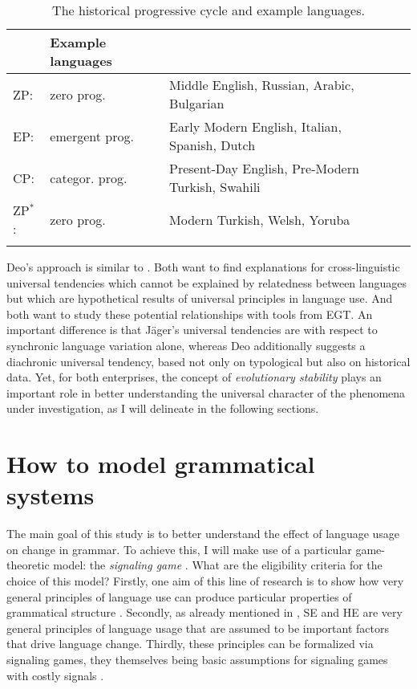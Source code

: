 \documentclass[output=paper,hidelinks]{langscibook}
\begin{document}
\begin{table}
\caption{The historical progressive cycle and example languages.\label{cycle}}
\begin{tabular}{l@{ }lll}
\lsptoprule
\multicolumn{2}{l}{System} &  Example languages \\\midrule
ZP: & zero prog. &  Middle English, Russian, Arabic, Bulgarian \\
EP: & emergent prog.  & Early Modern English, Italian, Spanish, Dutch\\
CP: & categor. prog.  & Present-Day English, Pre-Modern Turkish, Swahili \\
ZP$^*$:&  zero prog.  & Modern Turkish, Welsh, Yoruba \\
\lspbottomrule
\end{tabular}
\end{table}

Deo's approach is similar to . Both want to find explanations for cross-linguistic universal tendencies which cannot be explained by relatedness between languages but which are hypothetical results of universal principles in language use. And both want to study these potential relationships with tools from EGT. An important  difference is that Jäger's universal tendencies are with respect to synchronic language variation alone, whereas Deo additionally suggests a diachronic universal tendency, based not only on typological but also on historical data. Yet, for both enterprises, the concept of \emph{evolutionary stability} plays an important role in better understanding the universal character of the phenomena under investigation, as I will delineate in the following sections.


\section{How to model grammatical systems}
\label{sec:tutorial}

The main goal of this study is to better understand the effect of language usage on change in grammar. To achieve this, I will make use of a particular game-theoretic model: the \emph{signaling game} \citep{Lewis69}. What are the eligibility criteria for the choice of this model? Firstly, one aim of this line of research is to show how very general principles of language use can produce particular properties of grammatical structure \citep[cf.][]{JaegerVanRooy07}. Secondly, as already mentioned in , SE and HE are very general principles of language usage that are assumed to be important factors that  drive language change. Thirdly, these principles can be formalized via signaling games, they themselves being basic assumptions for signaling games with costly signals \citep[cf.][]{jaeger08stability}.
\end{document}
